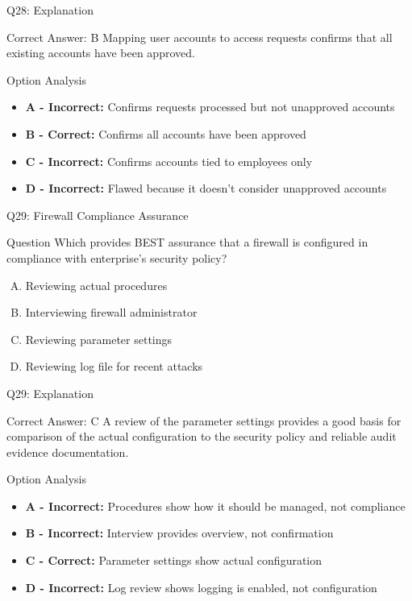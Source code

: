 \documentclass{beamer}
\begin{document}
	\begin{frame}{Q28: Explanation}
		\begin{block}{Correct Answer: B}
			Mapping user accounts to access requests confirms that all existing accounts have been approved.
		\end{block}
		\begin{block}{Option Analysis}
			\begin{itemize}
				\item \textbf{A - Incorrect:} Confirms requests processed but not unapproved accounts
				\item \textbf{B - Correct:} Confirms all accounts have been approved
				\item \textbf{C - Incorrect:} Confirms accounts tied to employees only
				\item \textbf{D - Incorrect:} Flawed because it doesn't consider unapproved accounts
			\end{itemize}
		\end{block}
	\end{frame}
	
	\begin{frame}{Q29: Firewall Compliance Assurance}
		\begin{block}{Question}
			Which provides BEST assurance that a firewall is configured in compliance with enterprise's security policy?
		\end{block}
		\begin{enumerate}[(A)]
			\item Reviewing actual procedures
			\item Interviewing firewall administrator
			\item Reviewing parameter settings
			\item Reviewing log file for recent attacks
		\end{enumerate}
	\end{frame}
	
	\begin{frame}{Q29: Explanation}
		\begin{block}{Correct Answer: C}
			A review of the parameter settings provides a good basis for comparison of the actual configuration to the security policy and reliable audit evidence documentation.
		\end{block}
		\begin{block}{Option Analysis}
			\begin{itemize}
				\item \textbf{A - Incorrect:} Procedures show how it should be managed, not compliance
				\item \textbf{B - Incorrect:} Interview provides overview, not confirmation
				\item \textbf{C - Correct:} Parameter settings show actual configuration
				\item \textbf{D - Incorrect:} Log review shows logging is enabled, not configuration
			\end{itemize}
		\end{block}
	\end{frame}
	
\end{document}
